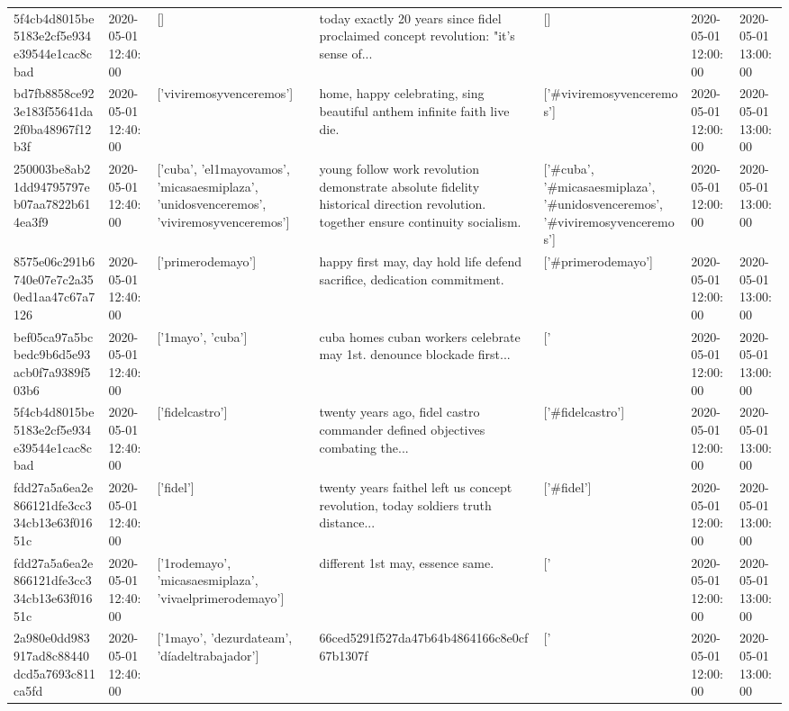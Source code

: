 \begin{tabular}{lllllll}
5f4cb4d8015be5183e2cf5e934e39544e1cac8cbad & 2020-05-01 12:40:00 & [] & today exactly 20 years since fidel proclaimed concept revolution: "it's sense of... & [] & 2020-05-01 12:00:00 & 2020-05-01 13:00:00 \\
bd7fb8858ce923e183f55641da2f0ba48967f12b3f & 2020-05-01 12:40:00 & ['viviremosyvenceremos'] & home, happy celebrating, sing beautiful anthem infinite faith live die. & ['#viviremosyvenceremos'] & 2020-05-01 12:00:00 & 2020-05-01 13:00:00 \\
250003be8ab21dd94795797eb07aa7822b614ea3f9 & 2020-05-01 12:40:00 & ['cuba', 'el1mayovamos', 'micasaesmiplaza', 'unidosvenceremos', 'viviremosyvenceremos'] & young follow work revolution demonstrate absolute fidelity historical direction revolution. together ensure continuity socialism. & ['#cuba', '#micasaesmiplaza', '#unidosvenceremos', '#viviremosyvenceremos'] & 2020-05-01 12:00:00 & 2020-05-01 13:00:00 \\
8575e06c291b6740e07e7c2a350ed1aa47c67a7126 & 2020-05-01 12:40:00 & ['primerodemayo'] & happy first may, day hold life defend sacrifice, dedication commitment. & ['#primerodemayo'] & 2020-05-01 12:00:00 & 2020-05-01 13:00:00 \\
bef05ca97a5bcbedc9b6d5e93acb0f7a9389f503b6 & 2020-05-01 12:40:00 & ['1mayo', 'cuba'] & cuba homes cuban workers celebrate may 1st. denounce blockade first... & ['#1mayo', '#cuba'] & 2020-05-01 12:00:00 & 2020-05-01 13:00:00 \\
5f4cb4d8015be5183e2cf5e934e39544e1cac8cbad & 2020-05-01 12:40:00 & ['fidelcastro'] & twenty years ago, fidel castro commander defined objectives combating the... & ['#fidelcastro'] & 2020-05-01 12:00:00 & 2020-05-01 13:00:00 \\
fdd27a5a6ea2e866121dfe3cc334cb13e63f01651c & 2020-05-01 12:40:00 & ['fidel'] & twenty years faithel left us concept revolution, today soldiers truth distance... & ['#fidel'] & 2020-05-01 12:00:00 & 2020-05-01 13:00:00 \\
fdd27a5a6ea2e866121dfe3cc334cb13e63f01651c & 2020-05-01 12:40:00 & ['1rodemayo', 'micasaesmiplaza', 'vivaelprimerodemayo'] & different 1st may, essence same. & ['#1rodemayo', '#micasaesmiplaza', '#vivaelprimerodemayo'] & 2020-05-01 12:00:00 & 2020-05-01 13:00:00 \\
2a980e0dd983917ad8c88440dcd5a7693c811ca5fd & 2020-05-01 12:40:00 & ['1mayo', 'dezurdateam', 'díadeltrabajador'] & 66ced5291f527da47b64b4864166c8e0cf67b1307f & ['#1mayo', '#dezurdateam', '#díadeltrabajador'] & 2020-05-01 12:00:00 & 2020-05-01 13:00:00 \\

\end{tabular}
